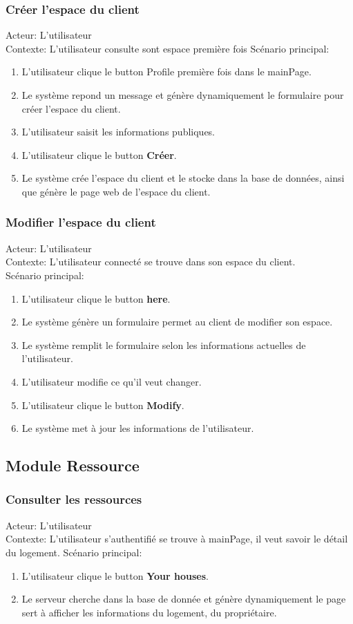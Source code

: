 \documentclass[14px]{article}
\begin{document}
\subsubsection{Créer l'espace du client}
Acteur: L'utilisateur\\
Contexte: L'utilisateur consulte sont espace première fois
Scénario principal:
\begin{enumerate}
	\item L'utilisateur clique le button Profile première fois dans le mainPage.
	\item Le système repond un message et génère dynamiquement le formulaire pour créer l'espace du client.
	\item L'utilisateur saisit les informations publiques.
	\item L'utilisateur clique le button \textbf{Créer}.
	\item Le système crée l'espace du client et le stocke dans la base de données, ainsi que génère le page web de l'espace du client.
\end{enumerate}

\subsubsection{Modifier l'espace du client}
Acteur: L'utilisateur\\
Contexte: L'utilisateur connecté se trouve dans son espace du client.\\
Scénario principal:
\begin{enumerate}
	\item L'utilisateur clique le button \textbf{here}.
	\item Le système génère un formulaire permet au client de modifier son espace.
	\item Le système remplit le formulaire selon les informations actuelles de l'utilisateur.
	\item L'utilisateur modifie ce qu'il veut changer.
	\item L'utilisateur clique le button \textbf{Modify}.
	\item Le système met à jour les informations de l'utilisateur.
\end{enumerate}

\subsection{Module Ressource}
\subsubsection{Consulter les ressources}
Acteur: L'utilisateur\\
Contexte: L'utilisateur s'authentifié se trouve à mainPage, il veut savoir le détail du logement.
Scénario principal:
\begin{enumerate}
	\item L'utilisateur clique le button \textbf{Your houses}.
	\item Le serveur cherche dans la base de donnée et génère dynamiquement le page sert à afficher les informations du logement, du propriétaire.
\end{enumerate}
\end{document}
